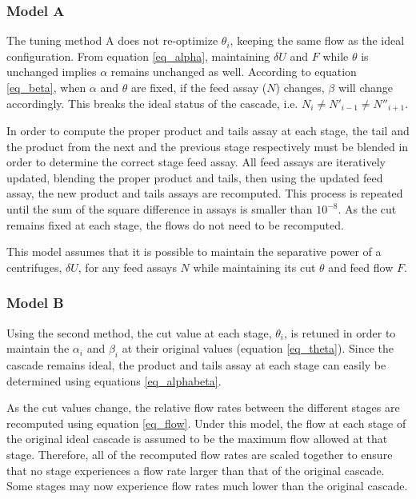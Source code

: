 \subsubsection{Model A}

The tuning method A does not re-optimize $\theta_i$, keeping the same flow as the
ideal configuration. From equation \eqref{eq_alpha}, maintaining $\delta U$ and
$F$ while $\theta$ is unchanged implies $\alpha$ remains unchanged as well.
According to equation \eqref{eq_beta}, when $\alpha$ and $\theta$ are fixed, if
the feed assay ($N$) changes, $\beta$ will change accordingly.  This breaks the
ideal status of the cascade, i.e. $N_{i} \neq N'_{i-1} \neq N''_{i+1}$.


In order to compute the proper product and tails assay at each stage, the tail
and the product from the next and the previous stage respectively must be
blended in order to determine the correct stage feed assay. All feed assays are
iteratively updated, blending the proper product and tails, then using the
updated feed assay, the new product and tails assays are recomputed. This
process is repeated until the sum of the square difference in assays is smaller
than $10^{-8}$.  As the cut remains fixed at each stage, the flows do not need
to be recomputed.

This model assumes that it is possible to maintain the separative power of a
centrifuges, $\delta U$, for any feed assays $N$ while maintaining its cut
$\theta$ and feed flow $F$.

\subsubsection{Model B}

Using the second method, the cut value at each stage, $\theta_i$, is retuned in
order to maintain the $\alpha_i$ and $\beta_i$ at their original values
(equation \eqref{eq_theta}). Since the cascade remains ideal, the product and
tails assay at each stage can easily be determined using equations
\eqref{eq_alphabeta}.

As the cut values change, the relative flow rates between the different stages
are recomputed using equation \eqref{eq_flow}.  Under this model, the flow at
each stage of the original ideal cascade is assumed to be the maximum flow
allowed at that stage.  Therefore, all of the recomputed flow rates are scaled
together to ensure that no stage experiences a flow rate larger than that of
the original cascade.  Some stages may now experience flow rates much lower
than the original cascade.

